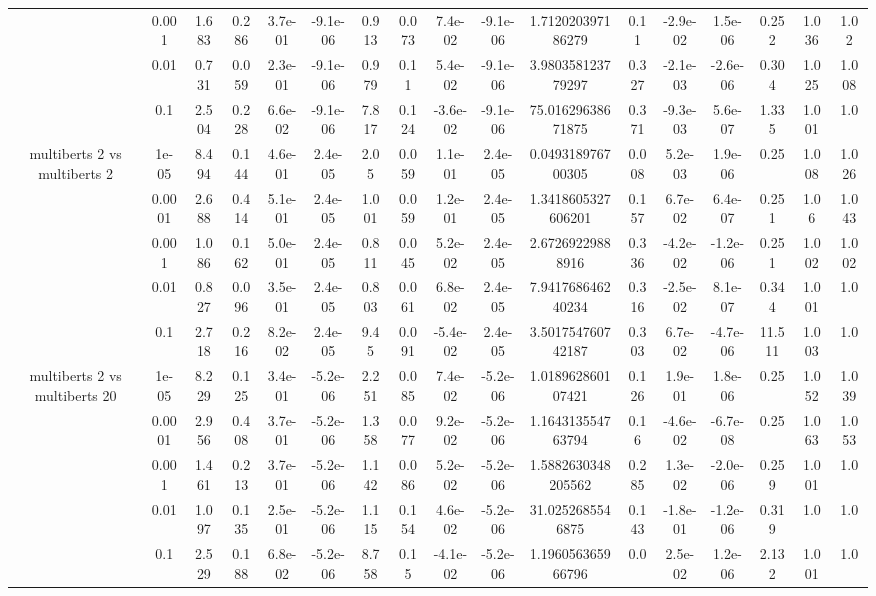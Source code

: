 \begin{tabular}{|c|c|c|c|c|c|c|c|c|c|c|c|c|c|c|c|c|}
 & 0.001 & 1.683 & 0.286 & 3.7e-01 & -9.1e-06 & 0.913 & 0.073 & 7.4e-02 & -9.1e-06 & 1.712020397186279 & 0.11 & -2.9e-02 & 1.5e-06 & 0.252 & 1.036 & 1.02 \\
 & 0.01 & 0.731 & 0.059 & 2.3e-01 & -9.1e-06 & 0.979 & 0.11 & 5.4e-02 & -9.1e-06 & 3.980358123779297 & 0.327 & -2.1e-03 & -2.6e-06 & 0.304 & 1.025 & 1.008 \\
 & 0.1 & 2.504 & 0.228 & 6.6e-02 & -9.1e-06 & 7.817 & 0.124 & -3.6e-02 & -9.1e-06 & 75.01629638671875 & 0.371 & -9.3e-03 & 5.6e-07 & 1.335 & 1.001 & 1.0 \\
\hline
\multirow{5}{*}{multiberts 2 vs multiberts 2} & 1e-05 & 8.494 & 0.144 & 4.6e-01 & 2.4e-05 & 2.05 & 0.059 & 1.1e-01 & 2.4e-05 & 0.049318976700305 & 0.008 & 5.2e-03 & 1.9e-06 & 0.25 & 1.008 & 1.026 \\
 & 0.0001 & 2.688 & 0.414 & 5.1e-01 & 2.4e-05 & 1.001 & 0.059 & 1.2e-01 & 2.4e-05 & 1.3418605327606201 & 0.157 & 6.7e-02 & 6.4e-07 & 0.251 & 1.06 & 1.043 \\
 & 0.001 & 1.086 & 0.162 & 5.0e-01 & 2.4e-05 & 0.811 & 0.045 & 5.2e-02 & 2.4e-05 & 2.67269229888916 & 0.336 & -4.2e-02 & -1.2e-06 & 0.251 & 1.002 & 1.002 \\
 & 0.01 & 0.827 & 0.096 & 3.5e-01 & 2.4e-05 & 0.803 & 0.061 & 6.8e-02 & 2.4e-05 & 7.941768646240234 & 0.316 & -2.5e-02 & 8.1e-07 & 0.344 & 1.001 & 1.0 \\
 & 0.1 & 2.718 & 0.216 & 8.2e-02 & 2.4e-05 & 9.45 & 0.091 & -5.4e-02 & 2.4e-05 & 3.501754760742187 & 0.303 & 6.7e-02 & -4.7e-06 & 11.511 & 1.003 & 1.0 \\
\hline
\multirow{5}{*}{multiberts 2 vs multiberts 20} & 1e-05 & 8.229 & 0.125 & 3.4e-01 & -5.2e-06 & 2.251 & 0.085 & 7.4e-02 & -5.2e-06 & 1.018962860107421 & 0.126 & 1.9e-01 & 1.8e-06 & 0.25 & 1.052 & 1.039 \\
 & 0.0001 & 2.956 & 0.408 & 3.7e-01 & -5.2e-06 & 1.358 & 0.077 & 9.2e-02 & -5.2e-06 & 1.164313554763794 & 0.16 & -4.6e-02 & -6.7e-08 & 0.25 & 1.063 & 1.053 \\
 & 0.001 & 1.461 & 0.213 & 3.7e-01 & -5.2e-06 & 1.142 & 0.086 & 5.2e-02 & -5.2e-06 & 1.5882630348205562 & 0.285 & 1.3e-02 & -2.0e-06 & 0.259 & 1.001 & 1.0 \\
 & 0.01 & 1.097 & 0.135 & 2.5e-01 & -5.2e-06 & 1.115 & 0.154 & 4.6e-02 & -5.2e-06 & 31.0252685546875 & 0.143 & -1.8e-01 & -1.2e-06 & 0.319 & 1.0 & 1.0 \\
 & 0.1 & 2.529 & 0.188 & 6.8e-02 & -5.2e-06 & 8.758 & 0.15 & -4.1e-02 & -5.2e-06 & 1.196056365966796 & 0.0 & 2.5e-02 & 1.2e-06 & 2.132 & 1.001 & 1.0 \\

\end{tabular}
